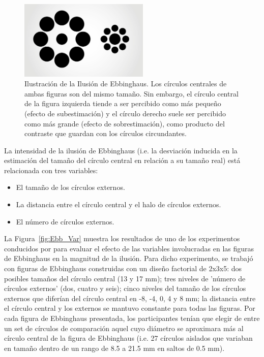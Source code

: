 \begin{figure}[th]
\centering
\includegraphics[width=0.55\textwidth]{Figures/Ebbinghaus} 
\decoRule
\caption[Ilusión de Ebbinghaus ejemplar]{Ilustración de la Ilusión de Ebbinghaus. Los círculos centrales de ambas figuras son del mismo tamaño. Sin embargo, el círculo central de la figura izquierda tiende a ser percibido como más pequeño (efecto de subestimación) y el círculo derecho suele ser percibido como más grande (efecto de sobrestimación), como producto del contraste que guardan con los círculos circundantes.}
\label{fig:Ebbinghaus}
\end{figure}

La intensidad de la ilusión de Ebbinghaus (i.e. la desviación inducida en la estimación del tamaño del círculo central en relación a su tamaño real) está relacionada con tres variables: 

\begin{itemize}
\item El tamaño de los círculos externos.
\item La distancia entre el círculo central y el halo de círculos externos.
\item El número de círculos externos.
\end{itemize}

La Figura~\ref{fig:Ebb_Var} muestra los resultados de uno de los experimentos conducidos por \parencite{Massaro1971} para evaluar el efecto de las variables involucradas en las figuras de Ebbinghaus en la magnitud de la ilusión. Para dicho experimento, se trabajó con figuras de Ebbinghaus construidas con un diseño factorial de 2x3x5: dos posibles tamaños del círculo central (13 y 17 mm); tres niveles de 'número de círculos externos' (dos, cuatro y seis); cinco niveles del tamaño de los círculos externos que diferían del círculo central en -8, -4, 0, 4 y 8 mm; la distancia entre el círculo central y los externos se mantuvo constante para todas las figuras. Por cada figura de Ebbinghaus presentada, los participantes tenían que elegir de entre un set de círculos de comparación aquel cuyo diámetro se aproximara más al círculo central de la figura de Ebbinghaus (i.e. 27 círculos aislados que variaban en tamaño dentro de un rango  de 8.5 a 21.5 mm en saltos de 0.5 mm).\\

